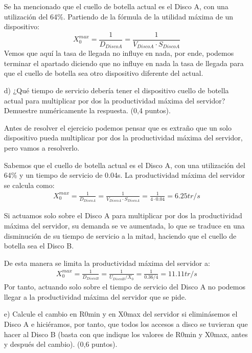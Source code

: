 \documentclass[a4paper,12pt]{article}
\begin{document}
\begin{enumerate}
    Se ha mencionado que el cuello de botella actual es el Disco A, con una utilización del 64\%. Partiendo de la fórmula de la utilidad máxima de un dispositivo:
    $$
    X_0^{max} = \frac{1}{D_{DiscoA} }  = \frac{1}{V_{DiscoA} \cdot S_{DiscoA}}
    $$
    Vemos que aquí la tasa de llegada no influye en nada, por ende, podemos terminar el apartado diciendo que no influye en nada la tasa de llegada para que el cuello de botella sea otro dispositivo diferente del actual.
    \item[d)] ¿Qué tiempo de servicio debería tener el dispositivo cuello de botella actual para multiplicar por dos la productividad máxima del servidor? Demuestre numéricamente la respuesta. (0,4 puntos).
    
    Antes de resolver el ejercicio podemos pensar que es extraño que un solo dispositivo pueda multiplicar por dos la productividad máxima del servidor, pero vamos a resolverlo.

    Sabemos que el cuello de botella actual es el Disco A, con una utilización del 64\% y un tiempo de servicio de 0.04s. La productividad máxima del servidor se calcula como:
    \begin{align*}
        X_0^{max} = \frac{1}{D_{DiscoA}} = \frac{1}{V_{DiscoA} \cdot S_{DiscoA}} = \frac{1}{4 \cdot 0.04} = 6.25 tr/s
    \end{align*}

    Si actuamos solo sobre el Disco A para multiplicar por dos la productividad máxima del servidor, su demanda se ve aumentada, lo que se traduce en una disminución de su tiempo de servicio a la mitad, haciendo que el cuello de botella sea el Disco B.
    
    De esta manera se limita la productividad máxima del servidor a:
    \begin{align*}
        X_0^{max} = \frac{1}{D_{DiscoB}} = \frac{1}{U_{DiscoB}/X_0} = \frac{1}{0.36/4} = 11.11 tr/s
    \end{align*}
    Por tanto, actuando solo sobre el tiempo de servicio del Disco A no podemos llegar a la productividad máxima del servidor que se pide.

    \item[e)] Calcule el cambio en R0min y en X0max del servidor si eliminásemos el Disco A e hiciéramos, por tanto, que todos los accesos a disco se tuvieran que hacer al Disco B (basta con que indique los valores de R0min y X0max, antes y después del cambio). (0,6 puntos).
    
     \\


\end{enumerate}
\end{document}
